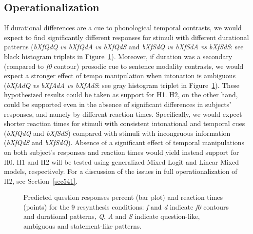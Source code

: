 \subsection{Operationalization}\label{sec521}
If durational differences are a cue to phonological temporal contrasts, we would expect to find significantly different responses for stimuli with different durational patterns (\textit{bXfQdQ vs bXfQdA vs bXfQdS} and \textit{bXfSdQ vs bXfSdA vs bXfSdS}: see black histogram triplets in Figure~\ref{fig501}). Moreover, if duration was a secondary (compared to \textit{f0} contour) prosodic cue to sentence modality contrasts, we would expect a stronger effect of tempo manipulation when intonation is ambiguous (\textit{bXfAdQ vs bXfAdA vs bXfAdS}: see gray histogram triplet in Figure~\ref{fig501}). These hypothesized results could be taken as support for H1. H2, on the other hand, could be supported even in the absence of significant differences in subjects’ responses, and namely by different reaction times. Specifically, we would expect shorter reaction times for stimuli with consistent intonational and temporal cues (\textit{bXfQdQ} and \textit{bXfSdS}) compared with stimuli with incongruous information (\textit{bXfQdS} and \textit{bXfSdQ}). Absence of a significant effect of temporal manipulations on both subject's responses and reaction times would yield instead support for H0.
H1 and H2 will be tested using generalized Mixed Logit and Linear Mixed models, respectively. For a discussion of the issues in full operationalization of H2, see Section~\ref{sec541}.
\begin{figure}
\centering
{}
\caption{Predicted question responses percent (bar plot) and reaction times (points) for the 9 resynthesis conditions: \textit{f} and \textit{d} indicate \textit{f0} contours and durational patterns, \textit{Q}, \textit{A} and \textit{S} indicate question-like, ambiguous and statement-like patterns.}
\label{fig501}\end{figure}
